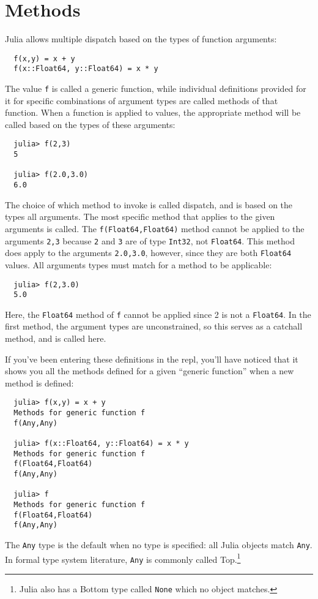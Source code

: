 \documentclass{article}
\begin{document}
\section{Methods}

Julia allows multiple dispatch based on the types of function arguments:
\begin{verbatim}
  f(x,y) = x + y
  f(x::Float64, y::Float64) = x * y
\end{verbatim}
The value \verb|f| is called a generic function, while individual definitions provided for it for specific combinations of argument types are called methods of that function.
When a function is applied to values, the appropriate method will be called based on the types of these arguments:
\begin{verbatim}
  julia> f(2,3)
  5

  julia> f(2.0,3.0)
  6.0
\end{verbatim}
The choice of which method to invoke is called dispatch, and is based on the types all arguments.
The most specific method that applies to the given arguments is called.
The \verb|f(Float64,Float64)| method cannot be applied to the arguments \verb|2,3| because \verb|2| and \verb|3| are of type \verb|Int32|, not \verb|Float64|.
This method does apply to the arguments \verb|2.0,3.0|, however, since they are both \verb|Float64| values.
All arguments types must match for a method to be applicable:
\begin{verbatim}
  julia> f(2,3.0)
  5.0
\end{verbatim}
Here, the \verb|Float64| method of \verb|f| cannot be applied since 2 is not a \verb|Float64|.
In the first method, the argument types are unconstrained, so this serves as a catchall method, and is called here.

If you've been entering these definitions in the repl, you'll have noticed that it shows you all the methods defined for a given ``generic function'' when a new method is defined:
\begin{verbatim}
  julia> f(x,y) = x + y
  Methods for generic function f
  f(Any,Any)

  julia> f(x::Float64, y::Float64) = x * y
  Methods for generic function f
  f(Float64,Float64)
  f(Any,Any)

  julia> f
  Methods for generic function f
  f(Float64,Float64)
  f(Any,Any)
\end{verbatim}
The \verb|Any| type is the default when no type is specified:
all Julia objects match \verb|Any|.
In formal type system literature, \verb|Any| is commonly called Top.\footnote{Julia also has a Bottom type called \texttt{None} which no object matches.}
\end{document}
